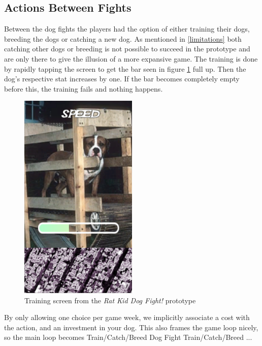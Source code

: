 \subsection{Actions Between Fights}
Between the dog fights the players had the option of either training their dogs, breeding the dogs or catching a new dog. As mentioned in \ref{limitations} both catching other dogs or breeding is not possible to succeed in the prototype and are only there to give the illusion of a more expansive game. The training is done by rapidly tapping the screen to get the bar seen in figure \ref{fig:training} full up. Then the dog's respective stat increases by one. If the bar becomes completely empty before this, the training fails and nothing happens.\ 

\begin{figure}[h!] 
	\centering
    \includegraphics[width=0.5\textwidth]{Training.png}
    \caption{Training screen from the \textit{Rat Kid Dog Fight!} prototype}
    \label{fig:training}
\end{figure}

By only allowing one choice per game week, we implicitly associate a cost with the action, and an investment in your dog. This also frames the game loop nicely, so the main loop becomes Train/Catch/Breed \rightarrow Dog Fight \rightarrow Train/Catch/Breed \rightarrow ...